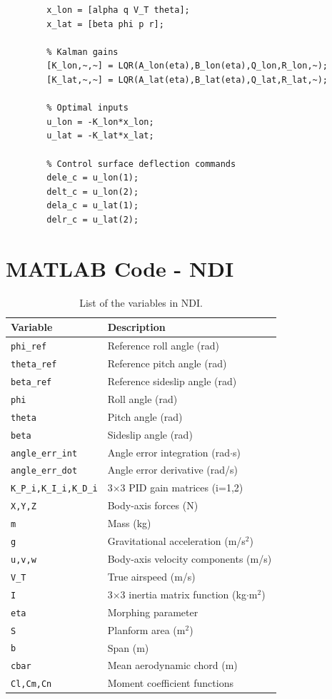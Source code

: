 \documentclass[a4paper, 12pt]{report}
\begin{document}
	\pagebreak
	
	\begin{lstlisting}[style=matlabFrameTB, gobble=4]
		% States
		x_lon = [alpha q V_T theta];
		x_lat = [beta phi p r];
		
		% Kalman gains
		[K_lon,~,~] = LQR(A_lon(eta),B_lon(eta),Q_lon,R_lon,~);
		[K_lat,~,~] = LQR(A_lat(eta),B_lat(eta),Q_lat,R_lat,~);
		
		% Optimal inputs
		u_lon = -K_lon*x_lon;
		u_lat = -K_lat*x_lat;
		
		% Control surface deflection commands
		dele_c = u_lon(1);
		delt_c = u_lon(2);
		dela_c = u_lat(1);
		delr_c = u_lat(2);
	\end{lstlisting}
	
	\chapter{MATLAB Code - NDI}
	
	\begin{table}[h]
		\centering
		\begin{tabular}{ll}
			\toprule
			\textbf{Variable} & \textbf{Description} \\
			\midrule
			\verb+phi_ref+ & Reference roll angle (rad) \\
			\verb+theta_ref+ & Reference pitch angle (rad) \\
			\verb+beta_ref+ & Reference sideslip angle (rad) \\
			\verb+phi+ & Roll angle (rad) \\
			\verb+theta+ & Pitch angle (rad) \\
			\verb+beta+ & Sideslip angle (rad) \\
			\verb+angle_err_int+ & Angle error integration (rad$\cdot$s) \\
			\verb+angle_err_dot+ & Angle error derivative (rad/s) \\
			\verb+K_P_i,K_I_i,K_D_i+ & 3$\times$3 PID gain matrices (i=1,2) \\
			\verb+X,Y,Z+ & Body-axis forces (N) \\
			\verb+m+ & Mass (kg) \\
			\verb+g+ & Gravitational acceleration (m/s$^2$) \\
			\verb+u,v,w+ & Body-axis velocity components (m/s) \\
			\verb+V_T+ & True airspeed (m/s) \\
			\verb+I+ & 3$\times$3 inertia matrix function (kg$\cdot$m$^2$) \\
			\verb+eta+ & Morphing parameter \\
			\verb+S+ & Planform area (m$^2$) \\
			\verb+b+ & Span (m) \\
			\verb+cbar+ & Mean aerodynamic chord (m) \\
			\verb+Cl,Cm,Cn+ & Moment coefficient functions \\
			\bottomrule
		\end{tabular}
		\caption{List of the variables in NDI.}
		\label{tab:ndi_variables}
	\end{table}
	
\end{document}
